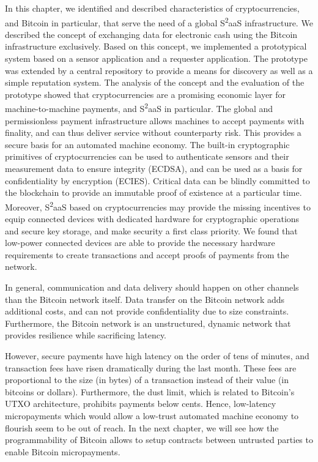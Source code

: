 In this chapter, we identified and described characteristics of cryptocurrencies, and Bitcoin in particular, that serve the need of a global S\textsuperscript{2}aaS infrastructure. We described the concept of exchanging data for electronic cash using the Bitcoin infrastructure exclusively. Based on this concept, we implemented a prototypical system based on a sensor application and a requester application. The prototype was extended by a central repository to provide a means for discovery as well as a simple reputation system. The analysis of the concept and the evaluation of the prototype showed that cryptocurrencies are a promising economic layer for machine-to-machine payments, and S\textsuperscript{2}aaS in particular. The global and permissionless payment infrastructure allows machines to accept payments with finality, and can thus deliver service without counterparty risk. This provides a secure basis for an automated machine economy. The built-in cryptographic primitives of cryptocurrencies can be used to authenticate sensors and their measurement data to ensure integrity (\ac{ECDSA}), and can be used as a basis for confidentiality by encryption (\ac{ECIES}). Critical data can be blindly committed to the blockchain to provide an immutable proof of existence at a particular time. Moreover, S\textsuperscript{2}aaS based on cryptocurrencies may provide the missing incentives to equip connected devices with dedicated hardware for cryptographic operations and secure key storage, and make security a first class priority. 
We found that low-power connected devices are able to provide the necessary hardware requirements to create transactions and accept proofs of payments from the network. 

In general, communication and data delivery should happen on other channels than the Bitcoin network itself. Data transfer on the Bitcoin network adds additional costs, and can not provide confidentiality due to size constraints. Furthermore, the Bitcoin network is an unstructured, dynamic network that provides resilience while sacrificing latency.

However, secure payments have high latency on the order of tens of minutes, and transaction fees have risen dramatically during the last month. These fees are proportional to the size (in bytes) of a transaction instead of their value (in bitcoins or dollars). Furthermore, the dust limit, which is related to Bitcoin's \ac{UTXO} architecture, prohibits payments below cents. Hence, low-latency micropayments which would allow a low-trust automated machine economy to flourish seem to be out of reach. In the next chapter, we will see how the programmability of Bitcoin allows to setup contracts between untrusted parties to enable Bitcoin micropayments. 


